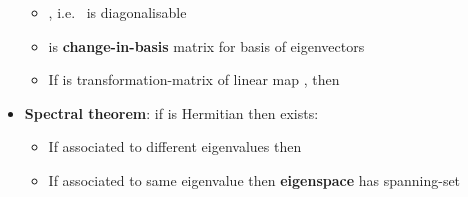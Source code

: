 \begin{itemize}
            \begin{itemize}

                  \item
                        , i.e.~ is diagonalisable
                  \item
                         is \textbf{change-in-basis} matrix for
                        basis
                         of
                        eigenvectors
                  \item
                        If  is transformation-matrix of linear
                        map , then
            \end{itemize}
      \item
            \textbf{Spectral theorem}: if  is Hermitian then
             exists:

            \begin{itemize}

                  \item
                        If  associated to different
                        eigenvalues then 
                        \tcbbreak
                  \item
                        If associated to same eigenvalue \iMbox{\lambda} then
                        \textbf{eigenspace}  has spanning-set

                        \begin{itemize}


\end{itemize}
\end{itemize}
\end{itemize}
